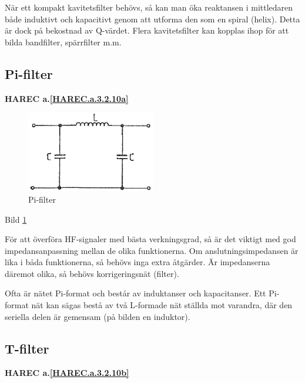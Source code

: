 När ett kompakt kavitetsfilter behövs, så kan man öka reaktansen i mittledaren
både induktivt och kapacitivt genom att utforma den som en spiral (helix).
Detta är dock på bekostnad av Q-värdet. Flera kavitetsfilter kan kopplas ihop
för att bilda bandfilter, spärrfilter m.m.

\subsection{Pi-filter}
\textbf{HAREC a.\ref{HAREC.a.3.2.10a}\label{myHAREC.a.3.2.10a}}

\begin{figure}
\includegraphics[width=0.5\textwidth]{images/bild_2_3-32.png}
\caption{Pi-filter}
\label{fig:BildII3-32}
\end{figure}

Bild \ref{fig:BildII3-32}

För att överföra HF-signaler med bästa verkningsgrad, så är det viktigt med god
impedansanpassning mellan de olika funktionerna. Om anslutningsimpedansen är
lika i båda funktionerna, så behövs inga extra åtgärder. Är impedanserna däremot
olika, så behövs korrigeringsnät (filter).

Ofta är nätet Pi-format och består av induktanser och kapacitanser. Ett
Pi-format nät kan sägas bestå av två L-formade nät ställda mot varandra, där
den seriella delen är gemensam (på bilden en induktor).

\subsection{T-filter}
\textbf{HAREC a.\ref{HAREC.a.3.2.10b}\label{myHAREC.a.3.2.10b}}

